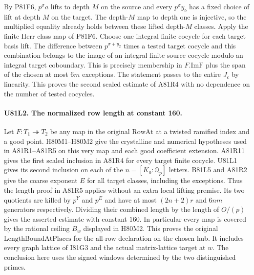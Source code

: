 By P81F6, $p^\sigma a$ lifts to depth $M$ on the source and
every $p^\sigma y_b$ has a fixed choice of lift at depth $M$ on
the target. The depth-$M$ map to depth one is injective, so
the multiplied equality already holds between these lifted
depth-$M$ classes. Apply the finite Herr class map of P81F6.
Choose one integral finite cocycle for each target basis lift.
The difference between $p^{\sigma+y_2}$ times a tested target
cocycle and this combination belongs to the image of an integral
finite source cocycle modulo an integral target coboundary.
This is precisely membership in $F.\mathrm{ImF}$ plus the span
of the chosen at most $6m$ exceptions. The statement passes to
the entire $J_c$ by linearity. This proves the second scaled
estimate of A81R4 with no dependence on the number of tested
cocycles.

\paragraph{U81L2. The normalized row length at constant 160.}
Let $F:T_1\twoheadrightarrow T_2$ be any map in the original
$\mathrm{RowAt}$ at a twisted ramified index and a good point.
H80M1--H80M2 give the crystalline and numerical hypotheses used
in A81R1--A81R5 on this very map and each good coefficient
extension. A81R11 gives the first scaled inclusion in A81R4 for
every target finite cocycle. U81L1 gives its second inclusion on
each of the $n=[K_0:\mathbb Q_p]$ letters. B81L5 and A81R2 give
the coarse exponent $E$ for all target classes, including the
exceptions. Thus the length proof in A81R5 applies without an
extra local lifting premise. Its two quotients are killed by
$p^Y$ and $p^E$ and have at most $(2n+2)r$ and $6nm$ generators
respectively. Dividing their combined length by the length of
$O/(p)$ gives the asserted estimate with constant $160$.
In particular every map is covered by the rational ceiling
$B_w$ displayed in H80M2. This proves the original
$\mathrm{LengthBoundAtPlaces}$ for the all-row declaration on
the chosen hub. It includes every graph lattice of I81G3 and the
actual matrix-lattice target at $w$. The conclusion here uses
the signed windows determined by the two distinguished primes.
